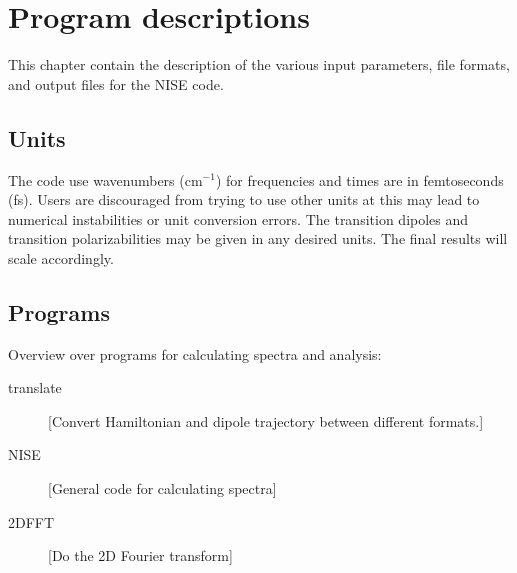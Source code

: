 \chapter{Program descriptions}
This chapter contain the description of the various input parameters, file formats, and output files for the NISE code.
\section{Units}
The code use wavenumbers (cm$^{-1}$) for frequencies and times are in femtoseconds (fs). Users are discouraged from trying to use other units at this may lead to numerical instabilities or unit conversion errors. The transition
dipoles and transition polarizabilities may be given in any desired units. The final results will scale accordingly.

\section{Programs}
Overview over programs for calculating spectra and analysis:\\
\begin{description}
\item [translate] [Convert Hamiltonian and dipole trajectory between different formats.]
\item [NISE] [General code for calculating spectra]
\item [2DFFT] [Do the 2D Fourier transform]
\end{description}


